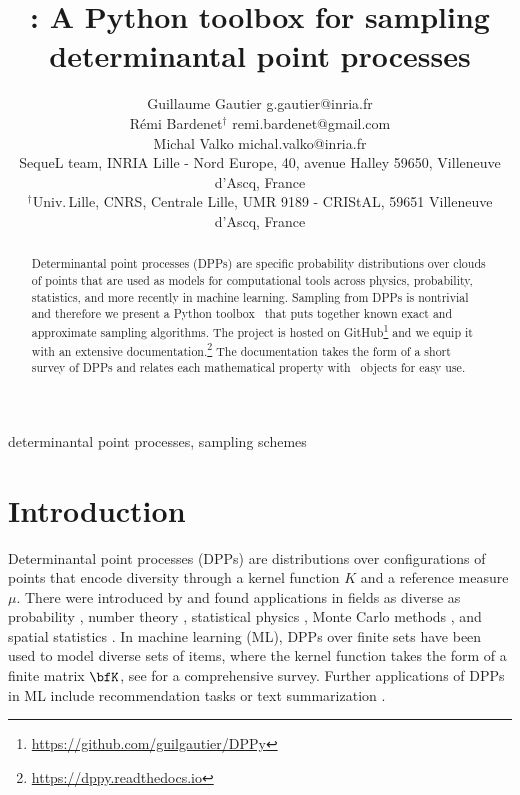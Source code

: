 \documentclass[twoside,11pt]{article}
\begin{document}
\title{\DPPy: A Python toolbox for sampling\\determinantal point processes}

\author{\name Guillaume Gautier \email g.gautier@inria.fr \\
       \name R\'emi Bardenet$^\dagger$ \email remi.bardenet@gmail.com \\
       \name Michal Valko \email michal.valko@inria.fr\\
       \addr SequeL team, INRIA Lille - Nord Europe,  40, avenue Halley 59650, Villeneuve d'Ascq, France\\
       \addr $^\dagger$Univ.\,Lille, CNRS, Centrale Lille, UMR 9189 - CRIStAL, 59651 Villeneuve d'Ascq, France
}

\editor{}

\maketitle

\setcounter{footnote}{3}
\begin{abstract}%
  Determinantal point processes (DPPs) are specific probability distributions over clouds of points that are used as models for computational tools across physics, probability, statistics, and more recently in machine learning.
  Sampling from DPPs is nontrivial and therefore we present a Python toolbox \DPPy\ that puts together known exact and approximate sampling algorithms.
  The project is hosted on GitHub\footnote{\url{https://github.com/guilgautier/DPPy}} and we equip it with an extensive documentation.\footnote{\label{fn:docs}\url{https://dppy.readthedocs.io}} The documentation takes the form of a short survey of DPPs and relates each mathematical property with \DPPy\ objects for easy use.

\end{abstract}

\begin{keywords}determinantal point processes, sampling schemes\end{keywords}

\section{Introduction} %
\label{sec:introduction}

  Determinantal point processes (DPPs) are distributions over configurations of points that encode diversity through a kernel function $K$ and a reference measure $\mu$.
  There were introduced by \citet{Mac75} and found applications in fields as diverse as probability \citep{Sos00, Kon05, HKPV06}, number theory \citep{RuSa96}, statistical physics \citep{PaBe11}, Monte Carlo methods \citep{BaHa16}, and spatial statistics \citep{LaMoRu15}.
  In machine learning (ML), DPPs over finite sets have been used to model diverse sets of items, where the kernel function takes the form of a finite matrix $\bfK$, see \citep{KuTa12} for a comprehensive survey.
  Further applications of DPPs in ML include recommendation tasks \citep{KaDeKo16, GaPaKo16} or text summarization \citep{DuBa18}.
\end{document}
